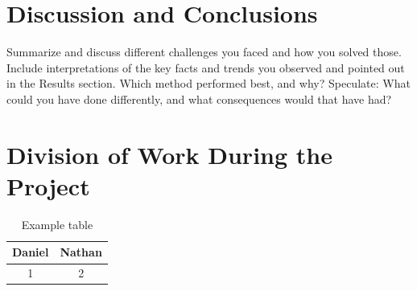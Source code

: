 \documentclass[sigconf]{acmart}
\begin{document}
\section{Discussion and Conclusions}

Summarize and discuss different challenges you faced and how you solved those. Include interpretations of the key facts and trends you observed and pointed out in the Results section. Which method performed best, and why? Speculate: What could you have done differently, and what consequences would that have had?





% 


\newpage
\appendix
\section{Division of Work During the Project}

\begin{table}[h]
\begin{center}
\caption{Example table}
\begin{tabular}{c|c}
     Daniel & Nathan \\ \hline
     1 & 2 \\
\end{tabular}
\label{table:1}
\end{center}
\end{table}
\end{document}
